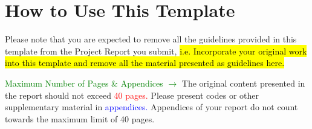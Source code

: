 \chapter*{How to Use This Template}
Please note that you are expected to remove all the guidelines provided in this template from the  Project Report you submit, \hl{i.e. Incorporate your original work into this template and remove all the material presented as guidelines here. }\par 

\textcolor{green}{Maximum Number of Pages \& Appendices $\longrightarrow$}
The original content presented in the report should not exceed \textcolor{red}{40 pages.} Please present codes or other supplementary material in \textcolor{blue}{appendices.} Appendices of your report do not count towards the maximum limit of  40 pages.